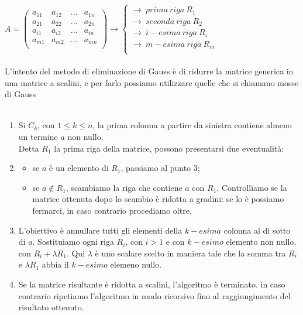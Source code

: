 \documentclass{report}
\begin{document}
  $ 
    A = \begin{pmatrix}
      a_{11} & a_{12} & ... & a_{1n} \\
      a_{21} & a_{22} & ... & a_{2n} \\
      a_{i1} & a_{i2} & ... & a_{in} \\
      a_{m1} & a_{m2} & ... & a_{mn} \\
    \end{pmatrix} \rightarrow \begin{cases}
      \rightarrow \ prima \ riga \ R_1 \\
      \rightarrow \ seconda \ riga \ R_2 \\
      \rightarrow \ i-esima \ riga \ R_i \\
      \rightarrow \ m-esima \ riga \ R_m \\
    \end{cases}
  $ 
\\
\\
L'intento del metodo di eliminazione di Gauss è di ridurre la matrice generica in una matrice a scalini, e per farlo possiamo utilizzare quelle che si chiamano mosse di Gauss
\\
\\
\begin{enumerate}
  \item{Si $C_k$, con $1 \le k \le n$, la prima colonna a partire da sinistra contiene almeno un termine $a$ non nullo.
  \\
  Detta $R_1$ la prima riga della matrice, possono presentarsi due eventualità:}
  \item{
    \begin{itemize}
      \item se $a$ è un elemento di $R_1$, passiamo al punto 3;
      \item se $a \not\in R_1$, scambiamo la riga che contiene $a$ con $R_1$. Controlliamo se la matrice ottenuta dopo lo scambio è ridotta a gradini: se lo è possiamo fermarci, in caso contrario procediamo oltre.
    \end{itemize}
    }
  \item{
      L'obiettivo è annullare tutti gli elementi della $k-esima$ colonna al di sotto di $a$. Sostituiamo ogni riga $R_i$, con $i > 1$ e con $k-esimo$ elemento non nullo, con $R_i + \lambda R_1$. Qui $\lambda$ è uno scalare scelto in maniera tale che la somma tra $R_i$ e $\lambda R_1$ abbia il $k-esimo$ elemeno nullo.
    }
  \item{
      Se la matrice risultante è ridotta a scalini, l'algoritmo è terminato. in caso contrario ripetiamo l'algoritmo in modo ricorsivo fino al raggiungimento del risultato ottenuto.
    }
\end{enumerate}
\end{document}
